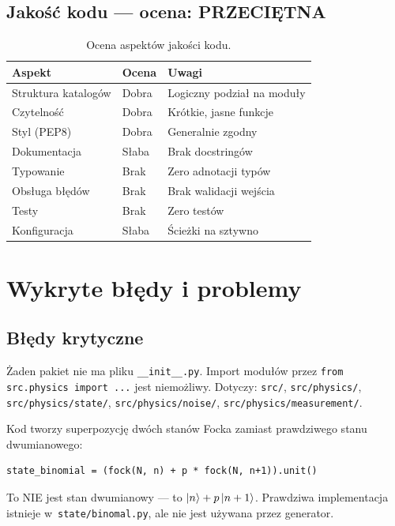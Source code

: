 \documentclass[12pt,a4paper]{article}
\begin{document}
\subsection{Jakość kodu --- ocena: PRZECIĘTNA}

\begin{table}[htbp]
\centering
\caption{Ocena aspektów jakości kodu.}
\label{tab:jakosc}
\begin{tabular}{@{}llp{6cm}@{}}
\toprule
\textbf{Aspekt} & \textbf{Ocena} & \textbf{Uwagi} \\
\midrule
Struktura katalogów & Dobra    & Logiczny podział na moduły \\
Czytelność          & Dobra    & Krótkie, jasne funkcje \\
Styl (PEP8)         & Dobra    & Generalnie zgodny \\
Dokumentacja        & Słaba    & Brak docstringów \\
Typowanie           & Brak     & Zero adnotacji typów \\
Obsługa błędów      & Brak     & Brak walidacji wejścia \\
Testy               & Brak     & Zero testów \\
Konfiguracja        & Słaba    & Ścieżki na sztywno \\
\bottomrule
\end{tabular}
\end{table}

\section{Wykryte błędy i problemy}
\label{sec:bledy}

\subsection{Błędy krytyczne}

\begin{warningbox}
Żaden pakiet nie ma pliku \texttt{\_\_init\_\_.py}. Import modułów przez \texttt{from src.physics import ...} jest niemożliwy. Dotyczy: \texttt{src/}, \texttt{src/physics/}, \texttt{src/physics/state/}, \texttt{src/physics/noise/}, \texttt{src/physics/measurement/}.
\end{warningbox}

\begin{warningbox}
Kod tworzy superpozycję dwóch stanów Focka zamiast prawdziwego stanu dwumianowego:
\begin{lstlisting}[numbers=none]
state_binomial = (fock(N, n) + p * fock(N, n+1)).unit()
\end{lstlisting}
To NIE jest stan dwumianowy --- to $\ket{n} + p\ket{n+1}$. Prawdziwa implementacja istnieje w~\texttt{state/binomal.py}, ale nie jest używana przez generator.
\end{warningbox}
\end{document}
